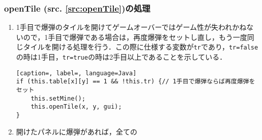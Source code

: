 \documentclass[a4j,11pt]{jsarticle}
\newcommand{\srcref}[1]{src. \ref{#1}}
\newcommand{\met}[1]{\ttfamily #1 \normalfont (\srcref{src:#1})の処理}
\begin{document}
\subsubsection*{\met{openTile}}
\begin{enumerate}
    \renewcommand{\labelenumi}{\arabic{enumi})}
    \item 1手目で爆弾のタイルを開けてゲームオーバーではゲーム性が失われかねないので，1手目で爆弾である場合は，再度爆弾をセットし直し，もう一度同じタイルを開ける処理を行う．この際に仕様する変数が\verb|tr|であり，\verb|tr=false|の時は1手目，\verb|tr=true|の時は2手目以上であることを示している．
          \begin{lstlisting}[caption=, label=, language=Java]
if (this.table[x][y] == 1 && !this.tr) {// 1手目で爆弾ならば再度爆弾をセット
    this.setMine();
    this.openTile(x, y, gui);
}
    \end{lstlisting}
    \item 開けたパネルに爆弾があれば，全ての
\end{enumerate}
\newpage
\end{document}
